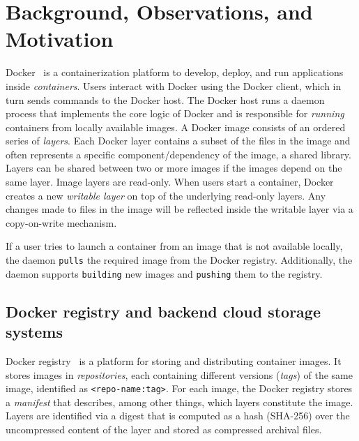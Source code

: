 \section{Background, Observations, and Motivation}
\label{sec:background}

Docker~\cite{docker} is a containerization platform to develop, deploy, and run applications inside \emph{containers}.
Users interact with Docker using the Docker client, which in turn sends commands to the Docker host.
The Docker host runs a daemon process that implements the core logic of Docker and is responsible for \emph{running} containers from locally available images.
A Docker image consists of an ordered series of \emph{layers}.
Each Docker layer contains a subset of the files in the image and often represents a specific component/dependency of the image, \eg a shared library.
Layers can be shared between two or more images if the images depend on the same layer.
Image layers are read-only.
When users start a container, Docker creates a new \emph{writable layer} on top of the underlying read-only layers.
Any changes made to files in the image will be reflected inside the writable layer via a copy-on-write mechanism.

If a user tries to launch a container from an image that is not available locally, the daemon \texttt{pulls} the required image from the Docker registry.
Additionally, the daemon supports \texttt{building} new images and \texttt{pushing} them to the registry.

\subsection{Docker registry and backend cloud storage systems}
Docker registry~\cite{docker-hub} is a platform for storing and distributing container images.
It stores images in \emph{repositories}, each containing different versions (\emph{tags}) of the same image, identified as \texttt{<repo-name:tag>}.
For each image, the Docker registry stores a \emph{manifest} that describes, among other things, which layers constitute the image.
Layers are identified via a digest that is computed as a hash (SHA-256) over the uncompressed content of the layer and stored as compressed archival files.

